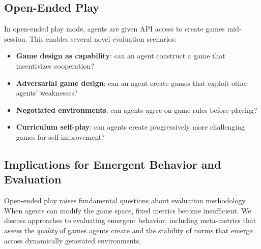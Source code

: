 
\subsection{Open-Ended Play}
\label{sec:open-ended}

In open-ended play mode, agents are given API access to create games mid-session.
This enables several novel evaluation scenarios:

\begin{itemize}[nosep]
    \item \textbf{Game design as capability}: can an agent construct a game
          that incentivizes cooperation?
    \item \textbf{Adversarial game design}: can an agent create games that
          exploit other agents' weaknesses?
    \item \textbf{Negotiated environments}: can agents agree on game rules
          before playing?
    \item \textbf{Curriculum self-play}: can agents create progressively
          more challenging games for self-improvement?
\end{itemize}


\subsection{Implications for Emergent Behavior and Evaluation}
\label{sec:emergence}

Open-ended play raises fundamental questions about evaluation methodology.
When agents can modify the game space, fixed metrics become insufficient.
We discuss approaches to evaluating emergent behavior, including meta-metrics
that assess the \emph{quality} of games agents create and the stability of
norms that emerge across dynamically generated environments.

